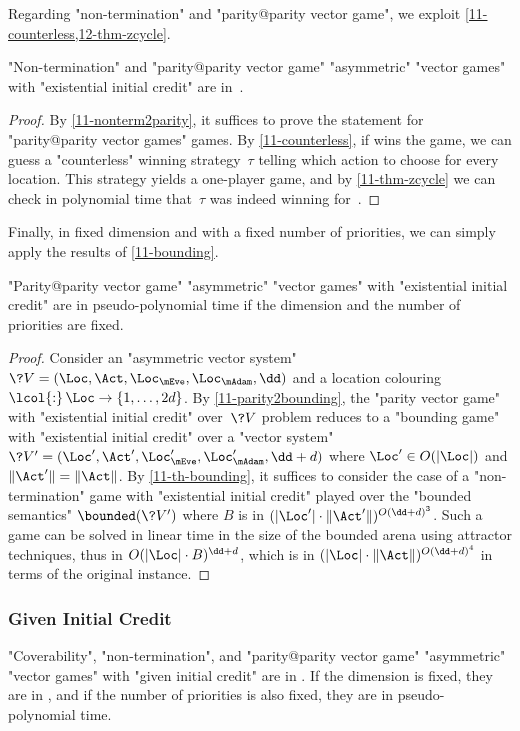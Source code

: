 Regarding "non-termination" and "parity@parity vector game", we
exploit \cref{11-counterless,12-thm-zcycle}.

\begin{theorem}\label{11-exist-easy}
  "Non-termination" and "parity@parity vector game" "asymmetric"
  "vector games" with "existential initial credit" are in~\coNP.
\end{theorem}
\begin{proof}
  By \cref{11-nonterm2parity}, it suffices to prove the statement for
  "parity@parity vector games" games.  By \cref{11-counterless},
  if \Adam wins the game, we can guess a "counterless" winning
  strategy~$\tau$ telling which action to choose for every location.
  This strategy yields a one-player game, and by \cref{11-thm-zcycle}
  we can check in polynomial time that~$\tau$ was indeed winning
  for~\Adam.
\end{proof}

Finally, in fixed dimension and with a fixed number of priorities, we
can simply apply the results of \cref{11-bounding}.
\begin{corollary}\label{11-exist-pseudop}
  "Parity@parity vector game" "asymmetric" "vector games" with
  "existential initial credit" are in pseudo-polynomial time if the
  dimension and the number of priorities are fixed.
\end{corollary}
\begin{proof}
  Consider an "asymmetric vector system"
  $\?V=(\Loc,\Act,\Loc_\mEve,\Loc_\mAdam,\dd)$ and a location
  colouring $\lcol{:}\,\Loc\to\{1,\dots,2d\}$.
  By \cref{11-parity2bounding}, the "parity vector game" with
  "existential initial credit" over~$\?V$ problem reduces to a
  "bounding game" with "existential initial credit" over a "vector
  system"~$\?V'=(\Loc',\Act',\Loc'_\mEve,\Loc'_\mAdam,\dd+d)$ where
  $\Loc'\in O(|\Loc|)$ and $\|\Act'\|=\|\Act\|$.
  By \cref{11-th-bounding}, it suffices to consider the case of a
  "non-termination" game with "existential initial credit" played over
  the "bounded semantics" $\bounded(\?V')$ where $B$ is in
  $(|\Loc'|\cdot\|\Act'\|)^{O(\dd+d)^3}$.  Such a game can be solved in
  linear time in the size of the bounded arena using attractor
  techniques, thus in $O(|\Loc|\cdot B)^{\dd+d}$, which is in
  $(|\Loc|\cdot\|\Act\|)^{O(\dd+d)^4}$ in terms of the original instance.
\end{proof}

\subsubsection{Given Initial Credit}
\label{11-subsec:up-given}

\begin{theorem}\label{11-avag-easy}
  "Coverability", "non-termination", and "parity@parity vector game"
  "asymmetric" "vector games" with "given initial credit" are in
  \kEXP[2].  If the dimension is fixed, they are in \EXP, and if the
  number of priorities is also fixed, they are in pseudo-polynomial
  time.
\end{theorem}

